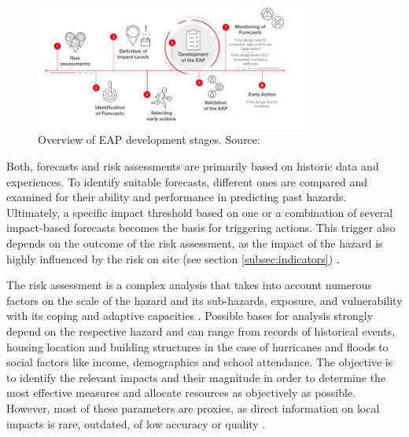\begin{figure}[!htp]
    \centering
    \includegraphics[width=0.8\textwidth]{figures/2023_MA_th_eap_validation_steps.jpg}
    \decoRule
    \caption[Overview of EAP development stages]{Overview of EAP development stages. Source: \autocite{grc2ndAfricanDialogue2019}}
    \label{fig:th_eap_stages}
\end{figure}

Both, forecasts and risk assessments are primarily based on historic data and experiences. To identify suitable forecasts, different ones are compared and examined for their ability and performance in predicting past hazards. Ultimately, a specific impact threshold based on one or a combination of several impact-based forecasts becomes the basis for triggering actions. This trigger also depends on the outcome of the risk assessment, as the impact of the hazard is highly influenced by the risk on site (see section \ref{subsec:indicators}) \autocite{ifrcFbFPractitionersManual2023,ifrcForecastbasedFinancingNew2019}.

The risk assessment is a complex analysis that takes into account numerous factors on the scale of the hazard and its sub-hazards, exposure, and vulnerability with its coping and adaptive capacities \autocite{ifrcFbFPractitionersManual2023}. Possible bases for analysis strongly depend on the respective hazard and can range from records of historical events, housing location and building structures in the case of hurricanes and floods to social factors like income, demographics and school attendance. The objective is to identify the relevant impacts and their magnitude in order to determine the most effective measures and allocate resources as objectively as possible. However, most of these parameters are proxies, as direct information on local impacts is rare, outdated, of low accuracy or quality \autocite{ifrcFbFPractitionersManual2023}.

